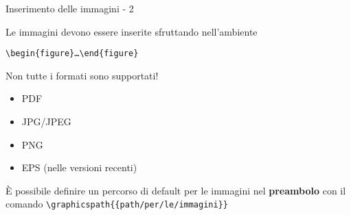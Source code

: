\begin{frame}{Inserimento delle immagini - 2}
	
Le immagini devono essere inserite sfruttando nell'ambiente 
\centerline{
\texttt{\textbackslash{}begin\{figure\}\dots{}\textbackslash{}end\{figure\}}
}

\vfill

Non tutte i formati sono supportati!
\begin{itemize}
	\item PDF
	\item JPG/JPEG
	\item PNG
	\item EPS (nelle versioni recenti)
\end{itemize}

\vfill

È possibile definire un percorso di default per le immagini nel 
\textbf{preambolo} con il comando 
\texttt{\textbackslash{}graphicspath\{\{path/per/le/immagini\}\}}

\end{frame}
